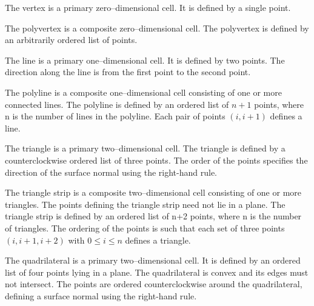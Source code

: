 \begin{description}[leftmargin=0cm,labelindent=0cm]

\item[Vertex.\index{cell!vertex}] The vertex is a primary zero--dimensional cell. It is defined by a single point.

\item[Polyvertex.\index{cell!polyvertex}\index{polyvertex}] The polyvertex is a composite zero--dimensional cell. The polyvertex is defined by an arbitrarily ordered list of points.

\item[Line.\index{cell!line}\index{line}] The line is a primary one--dimensional cell. It is defined by two points. The direction along the line is from the first point to the second point.

\item[Polyline.\index{cell!polyline}\index{polyline}] The polyline is a composite one--dimensional cell consisting of one or more connected lines. The polyline is defined by an ordered list of $n+1$ points, where n is the number of lines in the polyline. Each pair of points $(i, i+1)$ defines a line.

\item[Triangle.\index{cell!triangle}\index{triangle}] \label{subsec:linear_cells.triangle_strip} The triangle is a primary two--dimensional cell. The triangle is defined by a counterclockwise ordered list of three points. The order of the points specifies the direction of the surface normal using the right-hand rule.

\item[Triangle Strip.\index{cell!triangle strip}\index{triangle strip}] The triangle strip is a composite two--dimensional cell consisting of one or more triangles. The points defining the triangle strip need not lie in a plane. The triangle strip is defined by an ordered list of n+2 points, where n is the number of triangles. The ordering of the points is such that each set of three points $(i,i+1,i+2)$ with $0 \leq i \leq n$ defines a triangle.

\item[Quadrilateral.\index{cell!quadrilateral}\index{quadrilateral}] The quadrilateral is a primary two--dimensional cell. It is defined by an ordered list of four points lying in a plane. The quadrilateral is convex and its edges must not intersect. The points are ordered counterclockwise around the quadrilateral, defining a surface normal using the right-hand rule.


\end{description}
